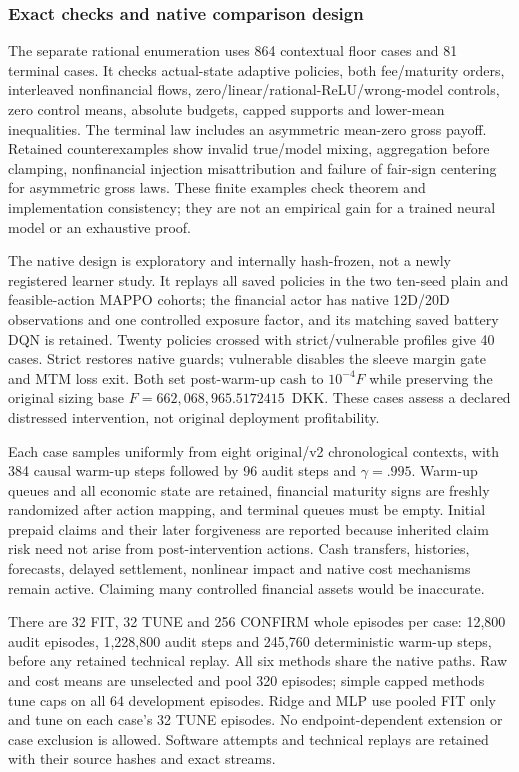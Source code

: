 \subsubsection{Exact checks and native comparison design}
The separate rational enumeration uses 864 contextual floor cases and 81 terminal cases. It checks actual-state adaptive policies, both fee/maturity orders, interleaved nonfinancial flows, zero/linear/rational-ReLU/wrong-model controls, zero control means, absolute budgets, capped supports and lower-mean inequalities. The terminal law includes an asymmetric mean-zero gross payoff. Retained counterexamples show invalid true/model mixing, aggregation before clamping, nonfinancial injection misattribution and failure of fair-sign centering for asymmetric gross laws. These finite examples check theorem and implementation consistency; they are not an empirical gain for a trained neural model or an exhaustive proof.

The native design is exploratory and internally hash-frozen, not a newly registered learner study. It replays all saved policies in the two ten-seed plain and feasible-action MAPPO cohorts; the financial actor has native 12D/20D observations and one controlled exposure factor, and its matching saved battery DQN is retained. Twenty policies crossed with strict/vulnerable profiles give 40 cases. Strict restores native guards; vulnerable disables the sleeve margin gate and MTM loss exit. Both set post-warm-up cash to $10^{-4}F$ while preserving the original sizing base $F=662{,}068{,}965.5172415$~DKK. These cases assess a declared distressed intervention, not original deployment profitability.

Each case samples uniformly from eight original/v2 chronological contexts, with 384 causal warm-up steps followed by 96 audit steps and $\gamma=.995$. Warm-up queues and all economic state are retained, financial maturity signs are freshly randomized after action mapping, and terminal queues must be empty. Initial prepaid claims and their later forgiveness are reported because inherited claim risk need not arise from post-intervention actions. Cash transfers, histories, forecasts, delayed settlement, nonlinear impact and native cost mechanisms remain active. Claiming many controlled financial assets would be inaccurate.

There are 32 FIT, 32 TUNE and 256 CONFIRM whole episodes per case: 12,800 audit episodes, 1,228,800 audit steps and 245,760 deterministic warm-up steps, before any retained technical replay. All six methods share the native paths. Raw and cost means are unselected and pool 320 episodes; simple capped methods tune caps on all 64 development episodes. Ridge and MLP use pooled FIT only and tune on each case's 32 TUNE episodes. No endpoint-dependent extension or case exclusion is allowed. Software attempts and technical replays are retained with their source hashes and exact streams.

